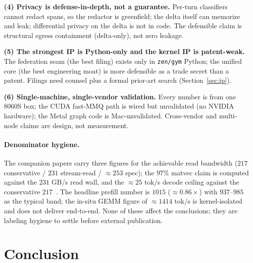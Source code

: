 \documentclass[11pt]{article}
\begin{document}
\textbf{(4) Privacy is defense-in-depth, not a guarantee.} Per-turn classifiers cannot redact spans, so the redactor is greenfield; the delta itself can memorize and leak; differential privacy on the delta is not in code. The defensible claim is structural egress containment (delta-only), not zero leakage.

\textbf{(5) The strongest IP is Python-only and the kernel IP is patent-weak.} The federation seam (the best filing) exists only in \texttt{zen/gym} Python; the unified core (the best engineering moat) is more defensible as a trade secret than a patent. Filings need counsel plus a formal prior-art search (Section~\ref{sec:ip}).

\textbf{(6) Single-machine, single-vendor validation.} Every number is from one 8060S box; the CUDA fast-MMQ path is wired but unvalidated (no NVIDIA hardware); the Metal graph code is Mac-unvalidated. Cross-vendor and multi-node claims are design, not measurement.

\paragraph{Denominator hygiene.} The companion papers carry three figures for the achievable read bandwidth ($217$ conservative / $231$ stream-read / $\approx 253$ spec); the $97\%$ matvec claim is computed against the $231$ GB/s read wall, and the $\approx 25$ tok/s decode ceiling against the conservative $217$~\cite{hanzo-rocm}. The headline prefill number is $1015$ ($\approx 0.86\times$) with $937$--$985$ as the typical band; the in-situ GEMM figure of $\approx 1414$ tok/s is kernel-isolated and does not deliver end-to-end. None of these affect the conclusions; they are labeling hygiene to settle before external publication.

\section{Conclusion}
\label{sec:conclusion}
\end{document}
